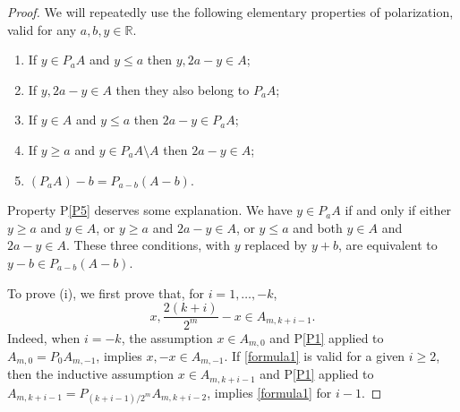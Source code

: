 \documentclass[12pt,reqno]{amsart}
\newcommand{\R}{{\mathbb R}}
\numberwithin{equation}{section}
\begin{document}
\begin{proof}
We will repeatedly use the following elementary properties of polarization, valid for any $a,b,y\in\R$.
\begin{enumerate}[(P1)]
  \item\label{P1} If $y\in P_a A$ and $y\leq a$ then $y, 2a-y\in A$;
  \item\label{P2} If $y, 2a-y\in A$ then they also belong to $P_a A$;
  \item\label{P3} If $y\in A$ and $y\leq a$ then $2a-y\in P_a A$;
 \item\label{P4} If $y\geq a$ and $y\in P_a A\setminus A$ then $2a-y\in A$;
  \item\label{P5} $(P_a A)-b=P_{a-b}(A-b)$.
\end{enumerate}
Property P\ref{P5} deserves some explanation. We have $y\in P_a A$ if and only if either $y\geq a$ and $y\in A$, or $y\geq a$ and $2a-y\in A$, or $y\leq a$ and both $y\in A$ and $2a-y\in A$. These three conditions, with $y$ replaced by $y+b$, are equivalent to $y-b\in P_{a-b}(A-b)$.

To prove (i), we first prove that, for $i=1,\dots,-k$,
\begin{equation}\label{formula1}
 x, \frac{2(k+i)}{2^m}-x\in A_{m,k+i-1}.
\end{equation}
Indeed, when $i=-k$, the assumption $x\in A_{m,0}$ and  P\ref{P1} applied to $A_{m,0}=P_{0}A_{m,-1}$, implies $x,-x\in A_{m,-1}$. If \eqref{formula1} is valid for a given $i\ge 2$, then the inductive assumption $x\in A_{m,k+i-1}$ and P\ref{P1} applied to $A_{m,k+i-1}=P_{(k+i-1)/2^m}A_{m,k+i-2}$, implies \eqref{formula1} for $i-1$.


\end{proof}
\end{document}

